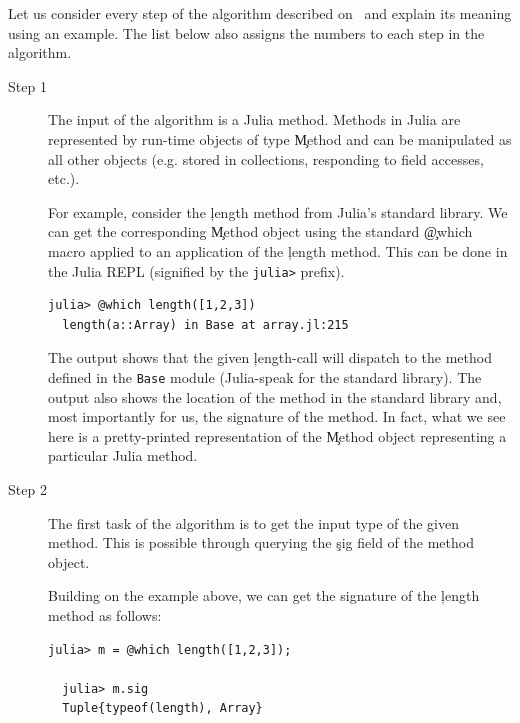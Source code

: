 Let us consider every step of the algorithm described
on~ and explain its meaning using an example.
The list below also assigns the numbers to each step in the algorithm.
\begin{description}

  \item[Step 1] The input of the algorithm is a Julia method. Methods in Julia are
  represented by run-time objects of type \c{Method} and can be manipulated as
  all other objects (e.g. stored in collections, responding to field accesses, etc.).

  For example, consider the \c{length} method from Julia's standard library. We can
  get the corresponding \c{Method} object using the standard \c{@which} macro
  applied to an application of the \c{length} method. This can be done in the
  Julia REPL (signified by the \texttt{julia>} prefix).

\begin{minipage}{.92\textwidth}
\begin{lstlisting}[style=jterm]
  julia> @which length([1,2,3])
  length(a::Array) in Base at array.jl:215
\end{lstlisting}
\end{minipage}

  The output shows that the given \c{length}-call will dispatch to the
  method defined in the \texttt{Base} module (Julia-speak for the standard
  library). The output also shows the location of the method in the
  standard library and, most importantly for us, the signature of the
  method. In fact, what we see here is a pretty-printed representation of
  the \c{Method} object representing a particular Julia method.

  \item[Step 2] The first task of the algorithm is to get the input type of the given
  method. This is possible through querying the \c{sig} field of the method object.

  Building on the example above, we can get the signature of the \c{length}
  method as follows:

\begin{minipage}{.92\textwidth}
\begin{lstlisting}[style=jterm]
  julia> m = @which length([1,2,3]);

  julia> m.sig
  Tuple{typeof(length), Array}
\end{lstlisting}
\end{minipage}


\end{description}
